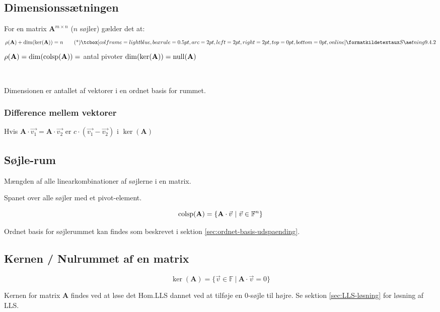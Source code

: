 \subsection{Dimensionssætningen}
For en matrix \( \mathbf{A}^{m \times n} \) ($n$ søjler) gælder det at:
\[
    \rho(\mathbf{A}) + \dim(\ker(\mathbf{A})) = n \kildetag{Sætning 9.4.2}
\]
$\rho(\mathbf{A}) = \dim(\operatorname{colsp}(\mathbf{A})) =$ antal pivoter \hfill $\dim(\ker(\mathbf{A})) = \operatorname{null}(\mathbf{A})$

\

Dimensionen er antallet af vektorer i en ordnet basis for rummet.

\subsubsection{Difference mellem vektorer}
Hvis \(\mathbf{A} \cdot \vec{v_1} = \mathbf{A} \cdot \vec{v_2}\) er \(c \cdot (\vec{v_1}-\vec{v_2})\) i \(\ker(\mathbf{A})\) 

\subsection{Søjle-rum}
\label{sec:soejlerum}

Mængden af alle linearkombinationer af søjlerne i en matrix.

Spanet over alle søjler med et pivot-element.

\[
    \operatorname{colsp}(\mathbf{A}) = \{ \mathbf{A} \cdot \vec{v} \ | \ \vec{v} \in \mathbb{F}^n \}
\]

Ordnet basis for søjlerummet kan findes som beskrevet i sektion \ref{sec:ordnet-basis-udspaending}.

\subsection{Kernen / Nulrummet af en matrix}
\label{sec:kerne}

\[ \ker(\mathbf{A}) = \{ \vec{v} \in \mathbb{F} \ | \ \mathbf{A} \cdot \vec{v} = 0 \} \]

Kernen for matrix \textbf{A} findes ved at løse det Hom.LLS dannet ved at tilføje en 0-søjle til højre.
Se sektion \ref{sec:LLS-løsning} for løsning af LLS.



